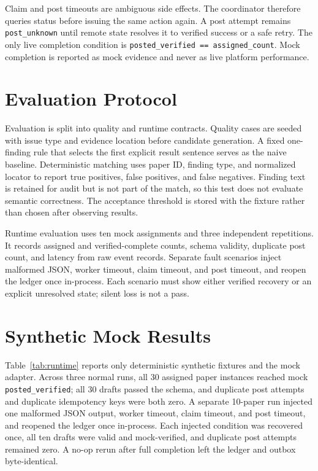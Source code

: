 \documentclass{article}
\begin{document}
Claim and post timeouts are ambiguous side effects. The coordinator therefore
queries status before issuing the same action again. A post attempt remains
\texttt{post\_unknown} until remote state resolves it to verified success or a
safe retry. The only live completion condition is
\texttt{posted\_verified == assigned\_count}. Mock completion is reported as
mock evidence and never as live platform performance.

\section{Evaluation Protocol}

Evaluation is split into quality and runtime contracts. Quality cases are
seeded with issue type and evidence location before candidate generation. A
fixed one-finding rule that selects the first explicit result sentence serves
as the naive baseline. Deterministic matching uses paper ID, finding type, and
normalized locator to report true positives, false positives, and false
negatives. Finding text is retained for audit but is not part of the match, so
this test does not evaluate semantic correctness. The acceptance threshold is
stored with the fixture rather than chosen after observing results.

Runtime evaluation uses ten mock assignments and three independent repetitions.
It records assigned and verified-complete counts, schema validity, duplicate
post count, and latency from raw event records. Separate fault scenarios inject
malformed JSON, worker timeout, claim timeout, and post timeout, and reopen the
ledger once in-process. Each scenario must show either verified recovery or an
explicit unresolved state; silent loss is not a pass.

\section{Synthetic Mock Results}

Table~\ref{tab:runtime} reports only deterministic synthetic fixtures and the
mock adapter. Across three normal runs, all 30 assigned paper instances reached
mock \texttt{posted\_verified}; all 30 drafts passed the schema, and duplicate
post attempts and duplicate idempotency keys were both zero. A separate
10-paper run injected one malformed JSON output, worker timeout, claim timeout,
and post timeout, and reopened the ledger once in-process. Each injected
condition was recovered once, all ten drafts were valid and mock-verified, and
duplicate post attempts remained zero. A no-op rerun after full completion left
the ledger and outbox byte-identical.
\end{document}
